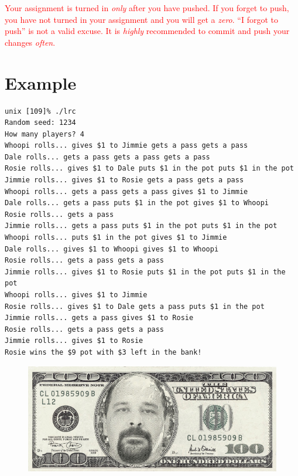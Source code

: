 \documentclass{article}
\begin{document}
\textcolor{red}{Your assignment is turned in \emph{only} after you have pushed.
If you forget to push, you have not turned in your assignment and you will get
a \emph{zero}. ``I forgot to push'' is not a valid excuse. It is \emph{highly} recommended to commit and push your changes \emph{often}.}



\newpage
\section*{Example}
\begin{verbatim}
unix [109]% ./lrc
Random seed: 1234
How many players? 4
Whoopi rolls... gives $1 to Jimmie gets a pass gets a pass
Dale rolls... gets a pass gets a pass gets a pass
Rosie rolls... gives $1 to Dale puts $1 in the pot puts $1 in the pot
Jimmie rolls... gives $1 to Rosie gets a pass gets a pass
Whoopi rolls... gets a pass gets a pass gives $1 to Jimmie
Dale rolls... gets a pass puts $1 in the pot gives $1 to Whoopi
Rosie rolls... gets a pass
Jimmie rolls... gets a pass puts $1 in the pot puts $1 in the pot
Whoopi rolls... puts $1 in the pot gives $1 to Jimmie
Dale rolls... gives $1 to Whoopi gives $1 to Whoopi
Rosie rolls... gets a pass gets a pass
Jimmie rolls... gives $1 to Rosie puts $1 in the pot puts $1 in the pot
Whoopi rolls... gives $1 to Jimmie
Rosie rolls... gives $1 to Dale gets a pass puts $1 in the pot
Jimmie rolls... gets a pass gives $1 to Rosie
Rosie rolls... gets a pass gets a pass
Jimmie rolls... gives $1 to Rosie
Rosie wins the $9 pot with $3 left in the bank!

\end{verbatim}

\begin{figure}[ht]
  \centering
    \includegraphics[width=5in]{darrelldollar.jpeg}
\end{figure}
\end{document}
